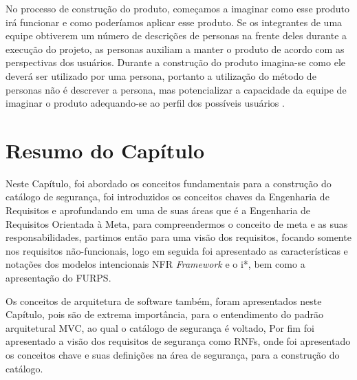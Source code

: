 No processo de construção do produto, começamos a imaginar como esse produto irá funcionar e como poderíamos aplicar esse produto\cite{soegaard2012encyclopedia}. Se os integrantes de uma equipe obtiverem um número de descrições de personas na frente deles durante a execução do projeto, as personas auxiliam a manter o produto de acordo com as perspectivas dos usuários. Durante a construção do produto imagina-se como ele deverá ser utilizado por uma persona, portanto a utilização do método de personas não é descrever a persona, mas potencializar a capacidade da equipe de imaginar o produto adequando-se ao perfil dos possíveis usuários \cite{soegaard2012encyclopedia}.  


\section{Resumo do Capítulo}

Neste Capítulo, foi abordado os conceitos fundamentais para a construção do catálogo de segurança, foi introduzidos os conceitos chaves da Engenharia de Requisitos e aprofundando em uma de suas áreas que é a Engenharia de Requisitos Orientada à Meta, para compreendermos o conceito de meta e as suas responsabilidades, partimos então para uma visão dos requisitos, focando somente nos requisitos não-funcionais, logo em seguida foi apresentado as características e notações dos modelos intencionais NFR \textit{Framework} e o i*, bem como a apresentação do FURPS. 

Os conceitos de arquitetura de software também, foram apresentados neste Capítulo, pois são de extrema importância, para o entendimento do padrão arquitetural MVC, ao qual o catálogo de segurança é voltado, Por fim foi apresentado a visão dos requisitos de segurança como RNFs, onde foi apresentado os conceitos chave e suas definições na área de segurança, para a construção do catálogo. 




